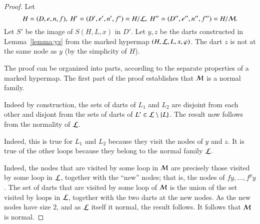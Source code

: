 \begin{proof} Let 
\begin{displaymath}
H=(D,e,n,f),\   H' =(D',e',n',f') = H/{\cal
    L},\  H'' = (D'',e'',n'',f'') = H/{\cal M}.   
\end{displaymath}
Let $S'$ be the image of $S(H,L,x)$ in $D'$.  Let $y,z$ be the darts
constructed in Lemma~\ref{lemma:yz} from the marked hypermap $(H,{\cal
  L},L,x,\varphi)$.  The dart $z$ is not at the same node as $y$ (by
the simplicity of $H$).

  The proof can be organized into parts, according to the separate
  properties of a marked hypermap.  The first part of the proof
  establishes that ${\cal M}$ is a normal family.




 
Indeed by construction, the sets of darts of $L_1$ and $L_2$
are disjoint from each other and disjont from the sets of darts of $L'\in
{\cal L}\setminus \{L\}$.  The result now follows from the normality of  ${\cal L}$.

   Indeed, this
is true for $L_1$ and $L_2$ because they visit the nodes of $y$ and
$z$.  It is true of the other loops because they belong to the
normal family ${\cal L}$. 

  
Indeed, the nodes that are visited by some loop in ${\cal M}$ are
precisely those visited by some loop in ${\cal L}$, together with the
``new'' nodes; that is, the nodes of $f y,\ldots,f^p y$.  The set of
darts that are visited by some loop of ${\cal M}$ is the union of the
set visited by loops in ${\cal L}$, together with the two darts at the
new nodes.  As the new nodes have size $2$, and as ${\cal L}$ itself
it normal, the result follows. It follows that ${\cal M}$ is normal.  



\end{proof}
